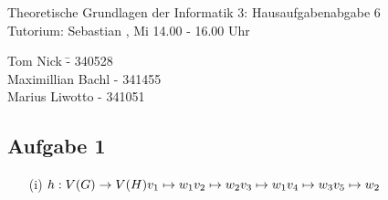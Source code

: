 \documentclass[a4paper,10pt]{article}
\begin{document}
\begin{center}
\Large{Theoretische Grundlagen der Informatik 3: Hausaufgabenabgabe 6} \\
\large{Tutorium: Sebastian , Mi 14.00 - 16.00 Uhr}
\end{center}
\begin{tabbing}
Tom Nick \hspace{2cm}\= - 340528\\
Maximillian Bachl \> - 341455 \\
Marius Liwotto\> -  341051
\end{tabbing}
\subsection*{Aufgabe 1}
\begin{enumerate}
	\item[(i)]
			\( h: V(G) \rightarrow V(H)\\
			v_1 \mapsto w_1 \\
			v_2 \mapsto w_2 \\
			v_3 \mapsto w_1 \\
			v_4 \mapsto w_3 \\
			v_5 \mapsto w_2 \)


\end{enumerate}
\end{document}
